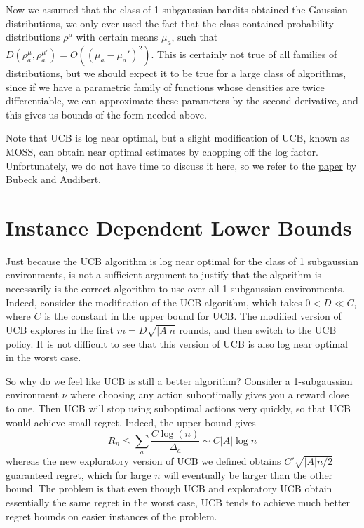 Now we assumed that the class of 1-subgaussian bandits obtained the Gaussian distributions, we only ever used the fact that the class contained probability distributions $\rho^\mu$ with certain means $\mu_a$, such that $D(\rho^\mu_a, \rho^{\mu'}_a) = O((\mu_a - \mu_a')^2)$. This is certainly not true of all families of distributions, but we should expect it to be true for a large class of algorithms, since if we have a parametric family of functions whose densities are twice differentiable, we can approximate these parameters by the second derivative, and this gives us bounds of the form needed above.

Note that UCB is log near optimal, but a slight modification of UCB, known as MOSS, can obtain near optimal estimates by chopping off the log factor. Unfortunately, we do not have time to discuss it here, so we refer to the \href{http://research.microsoft.com/en-us/um/people/sebubeck/COLT09_AB.pdf}{paper} by Bubeck and Audibert.

\section{Instance Dependent Lower Bounds}

Just because the UCB algorithm is log near optimal for the class of 1 subgaussian environments, is not a sufficient argument to justify that the algorithm is necessarily is the correct algorithm to use over all 1-subgaussian environments. Indeed, consider the modification of the UCB algorithm, which takes $0 < D \ll C$, where $C$ is the constant in the upper bound for UCB. The modified version of UCB explores in the first $m = D \sqrt{|A| n}$ rounds, and then switch to the UCB policy. It is not difficult to see that this version of UCB is also log near optimal in the worst case.

So why do we feel like UCB is still a better algorithm? Consider a 1-subgaussian environment $\nu$ where choosing any action suboptimally gives you a reward close to one. Then UCB will stop using suboptimal actions very quickly, so that UCB would achieve small regret. Indeed, the upper bound gives
%
\[ R_n \leq \sum_a \frac{C \log(n)}{\Delta_a} \sim C|A| \log n \]
%
whereas the new exploratory version of UCB we defined obtains $C' \sqrt{|A|n/2}$ guaranteed regret, which for large $n$ will eventually be larger than the other bound. The problem is that even though UCB and exploratory UCB obtain essentially the same regret in the worst case, UCB tends to achieve much better regret bounds on easier instances of the problem.

